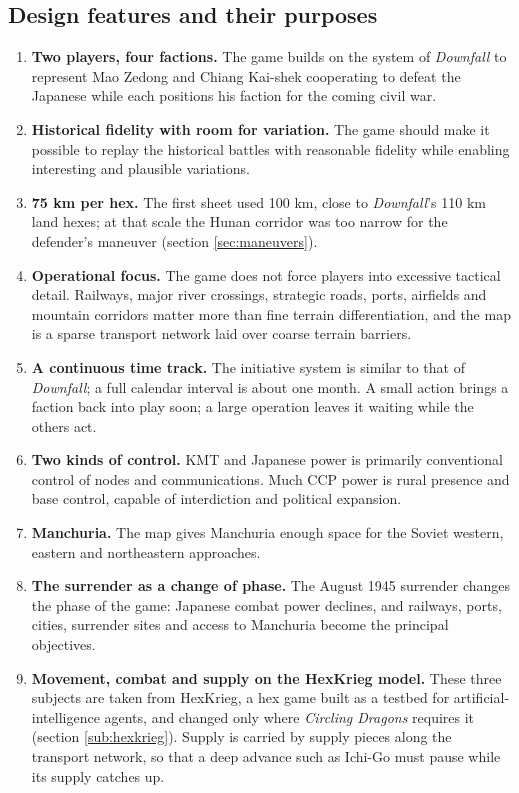 \documentclass[11pt]{article}
\begin{document}
\subsection{Design features and their purposes}\label{sub:design}
\begin{enumerate}
\item \textbf{Two players, four factions.} The game builds on the system of \emph{Downfall} to represent Mao Zedong and Chiang Kai-shek cooperating to defeat the Japanese while each positions his faction for the coming civil war.
\item \textbf{Historical fidelity with room for variation.} The game should make it possible to replay the historical battles with reasonable fidelity while enabling interesting and plausible variations.
\item \textbf{75 km per hex.} The first sheet used 100 km, close to \emph{Downfall}'s 110 km land hexes; at that scale the Hunan corridor was too narrow for the defender's maneuver (section \ref{sec:maneuvers}).
\item \textbf{Operational focus.} The game does not force players into excessive tactical detail. Railways, major river crossings, strategic roads, ports, airfields and mountain corridors matter more than fine terrain differentiation, and the map is a sparse transport network laid over coarse terrain barriers.
\item \textbf{A continuous time track.} The initiative system is similar to that of \emph{Downfall}; a full calendar interval is about one month. A small action brings a faction back into play soon; a large operation leaves it waiting while the others act.
\item \textbf{Two kinds of control.} KMT and Japanese power is primarily conventional control of nodes and communications. Much CCP power is rural presence and base control, capable of interdiction and political expansion.
\item \textbf{Manchuria.} The map gives Manchuria enough space for the Soviet western, eastern and northeastern approaches.
\item \textbf{The surrender as a change of phase.} The August 1945 surrender changes the phase of the game: Japanese combat power declines, and railways, ports, cities, surrender sites and access to Manchuria become the principal objectives.
\item \textbf{Movement, combat and supply on the HexKrieg model.} These three subjects are taken from HexKrieg, a hex game built as a testbed for artificial-intelligence agents, and changed only where \emph{Circling Dragons} requires it (section \ref{sub:hexkrieg}). Supply is carried by supply pieces along the transport network, so that a deep advance such as Ichi-Go must pause while its supply catches up.
\end{enumerate}
\end{document}
